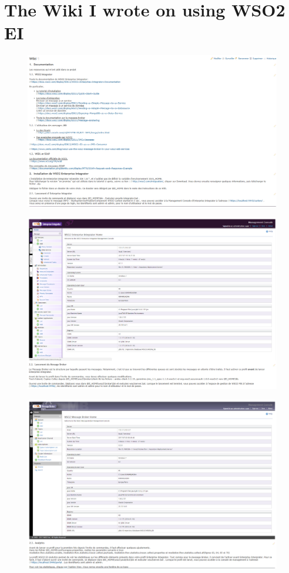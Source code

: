 \documentclass[12pt,a4paper,twoside]{article}
\begin{document}
\section{The Wiki I wrote on using WSO2 EI}
\begin{figure}[H]
\includegraphics[width=\textwidth, height= 0.45\textheight]{wiki1.PNG}
\end{figure}
\begin{figure}[H]
	\includegraphics[width=\textwidth, height= 0.45\textheight]{wiki2.PNG}
\end{figure}
\begin{figure}[H]
	\includegraphics[width=\textwidth, height= 0.45\textheight]{wiki3.PNG}
\end{figure}
\end{document}
